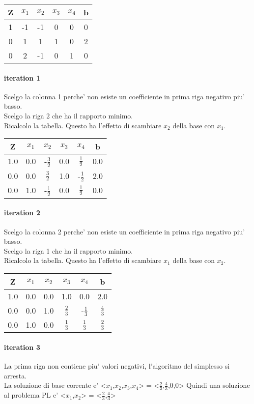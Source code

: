 \begin{center}
	\begin{tabular}{|c|c|c|c|c|c|}
		\hline
		Z & $x_1$ & $x_2$ & $x_3$ & $x_4$ & b\\
		\hline
		1 & -1 & -1 & 0 & 0 & 0\\
		0 & 1 & 1 & 1 & 0 & 2\\
		0 & 2 & -1 & 0 & 1 & 0\\
		\hline
	\end{tabular}
\end{center}
\paragraph{iteration 1}
Scelgo la colonna 1 perche' non esiste un coefficiente in prima riga negativo piu' basso. \\
Scelgo la riga 2 che ha il rapporto minimo. \\
Ricalcolo la tabella.
Questo ha l'effetto di scambiare $x_2$ della base con $x_1$. \
\begin{center}
	\begin{tabular}{|c|c|c|c|c|c|}
		\hline
		Z & $x_1$ & $x_2$ & $x_3$ & $x_4$ & b\\
		\hline
		1.0 & 0.0 & -$\frac 3 2$ & 0.0 & $\frac 1 2$ & 0.0\\
		0.0 & 0.0 & $\frac 3 2$ & 1.0 & -$\frac 1 2$ & 2.0\\
		0.0 & 1.0 & -$\frac 1 2$ & 0.0 & $\frac 1 2$ & 0.0\\
		\hline
	\end{tabular}
\end{center}
\paragraph{iteration 2}
Scelgo la colonna 2 perche' non esiste un coefficiente in prima riga negativo piu' basso. \\
Scelgo la riga 1 che ha il rapporto minimo. \\
Ricalcolo la tabella.
Questo ha l'effetto di scambiare $x_1$ della base con $x_2$. \
\begin{center}
	\begin{tabular}{|c|c|c|c|c|c|}
		\hline
		Z & $x_1$ & $x_2$ & $x_3$ & $x_4$ & b\\
		\hline
		1.0 & 0.0 & 0.0 & 1.0 & 0.0 & 2.0\\
		0.0 & 0.0 & 1.0 & $\frac 2 3$ & -$\frac 1 3$ & $\frac 4 3$\\
		0.0 & 1.0 & 0.0 & $\frac 1 3$ & $\frac 1 3$ & $\frac 2 3$\\
		\hline
	\end{tabular}
\end{center}
\paragraph{iteration 3}
La prima riga non contiene piu' valori negativi, l'algoritmo del simplesso si arresta. \\
La soluzione di base corrente e' <$x_1$,$x_2$,$x_3$,$x_4$> = <$\frac 2 3$,$\frac 4 3$,0,0>\*
Quindi una soluzione al problema PL e' <$x_1$,$x_2$> = <$\frac 2 3$,$\frac 4 3$>\*
